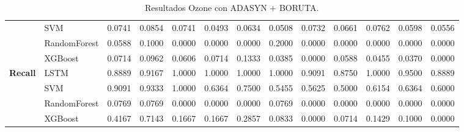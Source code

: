 \begin{table}[h]
\begin{adjustbox}{max width=15cm}
\begin{tabular}{|c|l|r|r|r|r|r|r|r|r|r|r|r|}
			& SVM &  0.0741 &  0.0854 &  0.0741 &  0.0493 &  0.0634 &  0.0508 &  0.0732 &  0.0661 &  0.0762 &  0.0598 &  0.0556 \\
			& RandomForest &  0.0588 &  0.1000 &  0.0000 &  0.0000 &  0.0000 &  0.2000 &  0.0000 &  0.0000 &  0.0000 &  0.0000 &  0.0000 \\
			& XGBoost &  0.0714 &  0.0962 &  0.0606 &  0.0714 &  0.1333 &  0.0385 &  0.0000 &  0.0588 &  0.0455 &  0.0370 &  0.0000 \\
			\hline
			\textbf{Recall} & LSTM &  0.8889 &  0.9167 &  1.0000 &  1.0000 &  1.0000 &  1.0000 &  0.9091 &  0.8750 &  1.0000 &  0.9500 &  0.8889 \\
			& SVM &  0.9091 &  0.9333 &  1.0000 &  0.6364 &  0.7500 &  0.5455 &  0.5625 &  0.5000 &  0.6154 &  0.6364 &  0.6000 \\
			& RandomForest &  0.0769 &  0.0769 &  0.0000 &  0.0000 &  0.0000 &  0.0769 &  0.0000 &  0.0000 &  0.0000 &  0.0000 &  0.0000 \\
			& XGBoost &  0.4167 &  0.7143 &  0.1667 &  0.1667 &  0.2857 &  0.0833 &  0.0000 &  0.0714 &  0.1429 &  0.1000 &  0.0000 \\
			\hline
		\end{tabular}
	\end{adjustbox}
	\caption{Resultados Ozone con ADASYN + BORUTA.}
	\label{tab:Ozone_ADASYN_BORUTA}
\end{table}

